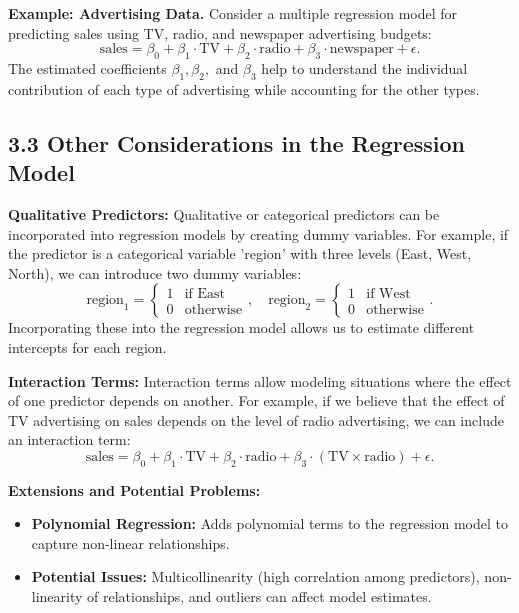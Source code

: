 \documentclass{article}
\begin{document}
\textbf{Example: Advertising Data.} Consider a multiple regression model for predicting sales using TV, radio, and newspaper advertising budgets:
\[
\text{sales} = \beta_0 + \beta_1 \cdot \text{TV} + \beta_2 \cdot \text{radio} + \beta_3 \cdot \text{newspaper} + \epsilon.
\]
The estimated coefficients \(\beta_1, \beta_2,\) and \(\beta_3\) help to understand the individual contribution of each type of advertising while accounting for the other types.

\subsection{3.3 Other Considerations in the Regression Model}
\textbf{Qualitative Predictors:} 
Qualitative or categorical predictors can be incorporated into regression models by creating dummy variables. For example, if the predictor is a categorical variable 'region' with three levels (East, West, North), we can introduce two dummy variables:
\[
\text{region}_1 = 
\begin{cases} 
1 & \text{if East} \\
0 & \text{otherwise}
\end{cases}, \quad 
\text{region}_2 = 
\begin{cases} 
1 & \text{if West} \\
0 & \text{otherwise}
\end{cases}.
\]
Incorporating these into the regression model allows us to estimate different intercepts for each region.

\textbf{Interaction Terms:}
Interaction terms allow modeling situations where the effect of one predictor depends on another. For example, if we believe that the effect of TV advertising on sales depends on the level of radio advertising, we can include an interaction term:
\[
\text{sales} = \beta_0 + \beta_1 \cdot \text{TV} + \beta_2 \cdot \text{radio} + \beta_3 \cdot (\text{TV} \times \text{radio}) + \epsilon.
\]

\textbf{Extensions and Potential Problems:}
\begin{itemize}
    \item \textbf{Polynomial Regression:} Adds polynomial terms to the regression model to capture non-linear relationships.
    \item \textbf{Potential Issues:} Multicollinearity (high correlation among predictors), non-linearity of relationships, and outliers can affect model estimates.
\end{itemize}
\end{document}
